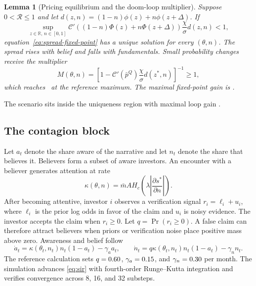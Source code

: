 \documentclass[11pt]{article}
\newtheorem{lemma}{Lemma}
\theoremstyle{definition}
\begin{document}
\begin{lemma}[Pricing equilibrium and the doom-loop multiplier]\label{lem:pricing}
Suppose $0<\mathcal R\leq1$ and let $d(z,n)=(1-n)\phi(z)+n\phi(z+\Delta)$. If
\begin{equation}
\sup_{z\in\mathbb R,\,n\in[0,1]}
\mathcal C'\!\left((1-n)\Phi(z)+n\Phi(z+\Delta)\right)
\frac{\chi}{\sigma}d(z,n)<1,
\label{eq:pricing-contraction}
\end{equation}
equation~\eqref{eq:spread-fixed-point} has a unique solution for every $(\theta,n)$. The spread rises with belief and falls with fundamentals. Small probability changes receive the multiplier
\[
M(\theta,n)=\left[1-\mathcal C'(\bar p^Q)
\frac{\chi}{\sigma}d(z^*,n)\right]^{-1}\geq1,
\]
which reaches \MultPeak\ at the reference maximum. The maximal fixed-point gain is \GainMax.
\end{lemma}

The scenario sits inside the uniqueness region with maximal loop gain \GainMax.

\subsection{The contagion block}

Let $a_t$ denote the share aware of the narrative and let $n_t$ denote the share that believes it. Believers form a subset of aware investors. An encounter with a believer generates attention at rate
\begin{equation}
\kappa(\theta,n)=\bar m A H_c\!\left(\lambda\left|\frac{\partial s^*}{\partial n}\right|\right).
\label{eq:attention-rate}
\end{equation}
After becoming attentive, investor $i$ observes a verification signal $r_i=\ell_i+u_i$, where $\ell_i$ is the prior log odds in favor of the claim and $u_i$ is noisy evidence. The investor accepts the claim when $r_i\geq0$. Let $q=\Pr(r_i\geq0)$. A false claim can therefore attract believers when priors or verification noise place positive mass above zero. Awareness and belief follow
\begin{equation}
\dot a_t=\kappa(\theta_t,n_t)n_t(1-a_t)-\gamma_a a_t,
\qquad
\dot n_t=q\kappa(\theta_t,n_t)n_t(1-a_t)-\gamma_n n_t.
\label{eq:sir}
\end{equation}
The reference calculation sets $q=0.60$, $\gamma_a=0.15$, and $\gamma_n=0.30$ per month. The simulation advances \eqref{eq:sir} with fourth-order Runge--Kutta integration and verifies convergence across 8, 16, and 32 substeps.
\end{document}
